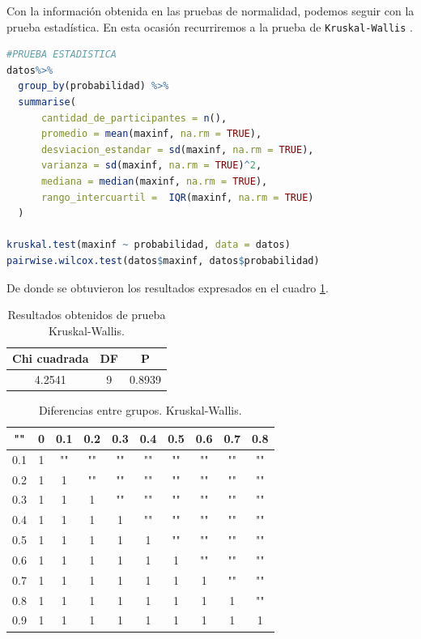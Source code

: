 \documentclass{article}
\begin{document}
Con la informaci\'on obtenida en las pruebas de normalidad, podemos seguir con la prueba estad\'istica. En esta ocasi\'on recurriremos a la prueba de \texttt{Kruskal-Wallis} \cite{Kruskal}.

\begin{lstlisting}[language=R, caption= Segmento de c\'odigo para prueba de Kruskal-Wallis]
#PRUEBA ESTADISTICA
datos%>%
  group_by(probabilidad) %>%
  summarise(
      cantidad_de_participantes = n(),
      promedio = mean(maxinf, na.rm = TRUE),
      desviacion_estandar = sd(maxinf, na.rm = TRUE),
      varianza = sd(maxinf, na.rm = TRUE)^2,
      mediana = median(maxinf, na.rm = TRUE),
      rango_intercuartil =  IQR(maxinf, na.rm = TRUE)
  )

kruskal.test(maxinf ~ probabilidad, data = datos)
pairwise.wilcox.test(datos$maxinf, datos$probabilidad)
\end{lstlisting}
De donde se obtuvieron los resultados expresados en el cuadro \ref{cuadro 2}.

\begin{table}[ht]
    \centering
    \caption{Resultados obtenidos de prueba Kruskal-Wallis.} 
    \begin{tabular}{|c|c|c|}
    \hline
    Chi cuadrada & DF & P  \\
    \hline
    4.2541 & 9 & 0.8939 \\
    \hline
\end{tabular}
    \label{cuadro 2}
\end{table}

\begin{table}[ht]
    \centering
    \caption{Diferencias entre grupos. Kruskal-Wallis.} 
    \begin{tabular}{|c|c|c|c|c|c|c|c|c|c|}
    \hline
    "" & 0 & 0.1 & 0.2 & 0.3 & 0.4 & 0.5 & 0.6 & 0.7 & 0.8 \\
    \hline
    0.1 & 1 & "" & "" & "" & "" & "" & "" & "" & "" \\
    \hline
    0.2 & 1 & 1 & "" & "" & "" & "" & "" & "" & "" \\
    \hline
    0.3 & 1 & 1 & 1 & "" & "" & "" & "" & "" & "" \\
    \hline
    0.4 & 1 & 1 & 1 & 1 & "" & "" & "" & "" & "" \\
    \hline
    0.5 & 1 & 1 & 1 & 1 & 1 & "" & "" & "" & "" \\
    \hline
    0.6 & 1 & 1 & 1 & 1 & 1 & 1 & "" & "" & "" \\
    \hline
    0.7 & 1 & 1 & 1 & 1 & 1 & 1 & 1 & "" & "" \\
    \hline
    0.8 & 1 & 1 & 1 & 1 & 1 & 1 & 1 & 1 & "" \\
    \hline
    0.9 & 1 & 1 & 1 & 1 & 1 & 1 & 1 & 1 & 1 \\
    \hline
\end{tabular}
    \label{cuadro 3}
\end{table}
\end{document}
